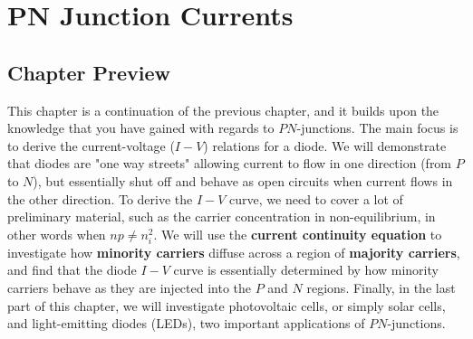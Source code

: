 \chapter{PN Junction Currents}
\label{ch:ch06_pn_currents}
\graphicspath{{./figs_pn_currents/}}
\section{Chapter Preview}
This chapter is a continuation of the previous chapter, and it builds upon the knowledge that you have gained with regards to $PN$-junctions.  The main focus is to derive the current-voltage ($I-V$) relations for a diode.  We will demonstrate that diodes are "one way streets" allowing current to flow in one direction (from $P$ to $N$), but essentially shut off and behave as open circuits when current flows in the other direction.  To derive the $I-V$ curve, we need to cover a lot of preliminary material, such as the carrier concentration in non-equilibrium, in other words when $n p \neq n_i^2$.  We will use the \textbf{current continuity equation} to investigate how \textbf{minority carriers} diffuse across a region of \textbf{majority carriers}, and find that the diode $I-V$ curve is essentially determined by how minority carriers behave as they are injected into the $P$ and $N$ regions.  Finally, in the last part of this chapter, we will investigate photovoltaic cells, or simply solar cells, and light-emitting diodes (LEDs), two important applications of $PN$-junctions.
\newpage
